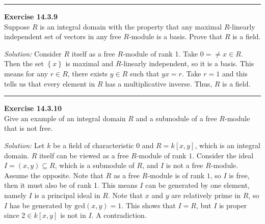 \documentclass[a4paper, 12pt]{article}
\newenvironment{problem}[2][Exercise]
    { \begin{mdframed}[backgroundcolor=gray!20] \textbf{#1 #2} \\}
    {  \end{mdframed}}
\newenvironment{solution}
    {\textit{Solution:}}
    {}
\begin{document}
\noindent\rule{7in}{2.8pt}
\begin{problem}{14.3.9}
Suppose \(R\) is an integral domain with the property that any maximal \(R\)-linearly independent set of vectors in any free \(R\)-module is a basis. Prove that \(R\) is a field.
\end{problem}
\begin{solution}
Consider \(R\) itself as a free \(R\)-module of rank 1. Take \(0=\neq x\in R\). Then the set \(\left\{ x \right\}\) is maximal and \(R\)-linearly independent, so it is a basis. This means for any \(r\in R\), there exists \(y\in R\) such that 
\(yx=r\). Take \(r=1\) and this tells us that every element in \(R\) has a multiplicative inverse. Thus, \(R\) is a field.
\end{solution}

\noindent\rule{7in}{2.8pt}
\begin{problem}{14.3.10}
Give an example of an integral domain \(R\) and a submodule of a free \(R\)-module that is not free.
\end{problem}
\begin{solution}
Let \(k\) be a field of characteristic \(0\) and \(R=k[x,y]\), which is an integral domain. \(R\) itself can be viewed as a free \(R\)-module of rank \(1\).  Consider the ideal \(I=(x,y)\subseteq R\), which is a submodule of \(R\), and \(I\) is not 
a free \(R\)-module. Assume the opposite. Note that \(R\) as a free \(R\)-module is of rank \(1\), so \(I\) is free, then it must also be of rank 1. This means \(I\) can be generated by one element, namely \(I\) is a principal ideal in 
\(R\). Note that \(x\) and \(y\) are relatively prime in \(R\), so \(I\) has be generated by \(\text{gcd}(x,y)=1\). This shows that \(I=R\), but \(I\) is proper since \(2\in k[x,y]\) is not in \(I\). A contradiction.  
\end{solution}
\end{document}
